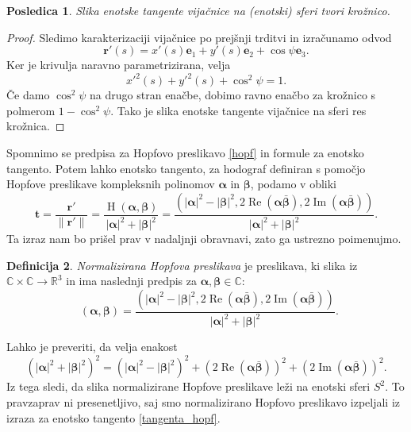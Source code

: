 \documentclass[12pt,a4paper,twoside]{article}
\theoremstyle{definition} %
\newtheorem{definicija}{Definicija}[section]
\theoremstyle{plain} %
\newtheorem{posledica}[definicija]{Posledica}
\theoremstyle{primerstyle}
\numberwithin{equation}{section}  %
\newcommand{\R}{\mathbb R}
\renewcommand{\C}{\mathbb C}
\newcommand{\tV}{\mathbf{t}}
\newcommand{\eV}{\mathbf{e}}
\newcommand{\rV}{\mathbf{r}}
\newcommand{\balpha}{\boldsymbol \alpha}
\newcommand{\bbeta}{\boldsymbol \beta}
\DeclareMathOperator{\hopf}{H}
\DeclareMathOperator{\ReC}{Re}
\DeclareMathOperator{\ImC}{Im}
\DeclareMathOperator{\nhopf}{\hat{H}}
\begin{document}
\begin{posledica}
	\label{vijacnica_slika_tangente}
	Slika enotske tangente %
	vijačnice na (enotski) sferi tvori krožnico.
\end{posledica}
\begin{proof}
	Sledimo karakterizaciji vijačnice po prejšnji trditvi in izračunamo odvod
	\begin{equation*}
		\rV'(s)=x'(s)\eV_1+y'(s)\eV_2+\cos\psi\eV_3.
	\end{equation*}
	Ker je krivulja naravno parametrizirana, velja
	\begin{equation*}
		x'^2(s)+y'^2(s)+\cos^2\psi=1.
	\end{equation*}
	Če damo $\cos^2\psi$ na drugo stran enačbe, dobimo ravno enačbo za krožnico s polmerom $1-\cos^2\psi.$ Tako je slika enotske tangente vijačnice na sferi res krožnica.
\end{proof}

Spomnimo se predpisa za Hopfovo preslikavo \eqref{hopf} in formule za enotsko tangento. Potem lahko enotsko tangento, za hodograf definiran s pomočjo Hopfove preslikave kompleksnih polinomov $\balpha$ in $\bbeta$, podamo v obliki
\begin{equation}
	\label{tangenta_hopf}
	\tV=\frac{\rV'}{\lVert\rV'\rVert}=\frac{\hopf(\balpha,\bbeta)}{|\balpha|^2+|\bbeta|^2}=\frac{(|\balpha|^2-|\bbeta|^2,2\ReC(\balpha\bar{\bbeta}),2\ImC(\balpha\bar{\bbeta}))}{|\balpha|^2+|\bbeta|^2}.
\end{equation}
Ta izraz nam bo prišel prav v nadaljnji obravnavi, zato ga ustrezno poimenujmo.
\begin{definicija}
	\label{norm_hopf_def}
	\emph{Normalizirana Hopfova preslikava} je preslikava, ki slika iz $\C\times\C\to\R^3$ in ima naslednji predpis za $\balpha,\bbeta\in\C$:
	\begin{equation}
		\label{norm_hopf}
		\nhopf(\balpha,\bbeta)=\frac{(|\balpha|^2-|\bbeta|^2,2\ReC(\balpha\bar{\bbeta}),2\ImC(\balpha\bar{\bbeta}))}{|\balpha|^2+|\bbeta|^2}.
	\end{equation}
\end{definicija}
Lahko je preveriti, da velja enakost 
\begin{equation}
	(|\balpha|^2+|\bbeta|^2)^2=(|\balpha|^2-|\bbeta|^2)^2+(2\ReC(\balpha\bar{\bbeta}))^2+(2\ImC(\balpha\bar{\bbeta}))^2.
\end{equation}
Iz tega sledi, da slika normalizirane Hopfove preslikave leži na enotski sferi $S^2.$ To pravzaprav ni presenetljivo, saj smo normalizirano Hopfovo preslikavo izpeljali iz izraza za enotsko tangento \eqref{tangenta_hopf}.
\end{document}
